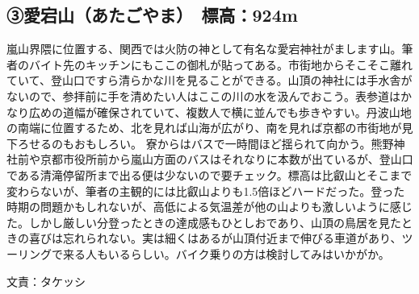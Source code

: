 \subsection{③愛宕山（あたごやま）　標高：924m}
嵐山界隈に位置する、関西では火防の神として有名な愛宕神社がまします山。筆者のバイト先のキッチンにもここの御札が貼ってある。市街地からそこそこ離れていて、登山口ですら清らかな川を見ることができる。山頂の神社には手水舎がないので、参拝前に手を清めたい人はここの川の水を汲んでおこう。表参道はかなり広めの道幅が確保されていて、複数人で横に並んでも歩きやすい。丹波山地の南端に位置するため、北を見れば山海が広がり、南を見れば京都の市街地が見下ろせるのもおもしろい。
寮からはバスで一時間ほど揺られて向かう。熊野神社前や京都市役所前から嵐山方面のバスはそれなりに本数が出ているが、登山口である清滝停留所まで出る便は少ないので要チェック。標高は比叡山とそこまで変わらないが、筆者の主観的には比叡山よりも1.5倍ほどハードだった。登った時期の問題かもしれないが、高低による気温差が他の山よりも激しいように感じた。しかし厳しい分登ったときの達成感もひとしおであり、山頂の鳥居を見たときの喜びは忘れられない。実は細くはあるが山頂付近まで伸びる車道があり、ツーリングで来る人もいるらしい。バイク乗りの方は検討してみはいかがか。

文責：タケッシ